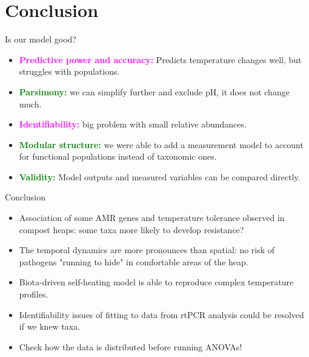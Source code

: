 \documentclass[mathserif,11pt]{beamer}
\begin{document}
\section{Conclusion}
\begin{frame}{Is our model good?}
\vspace{0.5cm}
	\begin{itemize}
		\item<1-> \textbf{\textcolor{magenta}{Predictive power and accuracy:}} Predicts temperature changes well, but struggles with populations.
		\item<2-> \textbf{\textcolor{green}{Parsimony:}} we can simplify further and exclude pH, it does not change much.
		\item<3-> \textbf{\textcolor{magenta}{Identifiability:}} big problem with small relative abundances.
		\item<4->  \textbf{\textcolor{green}{Modular structure:}} we were able to add a measurement model to account for functional populations instead of taxonomic ones.
		\item<5-> \textbf{\textcolor{green}{Validity:}} Model outputs and measured variables can be compared directly.
	\end{itemize}
\end{frame}
\begin{frame}{Conclusion}
\begin{itemize}
	\item Association of some AMR genes and temperature tolerance observed in compost heaps: some taxa more likely to develop resistance?
	\item The temporal dynamics are more pronounces than spatial: no risk of pathogens "running to hide" in comfortable areas of the heap.
	\item Biota-driven self-heating model is able to reproduce complex temperature profiles.
	\item Identifiability issues of fitting to data from rtPCR analysis could be resolved if we knew taxa.
    \item Check how the data is distributed before running ANOVAs!
\end{itemize}	
\end{frame}
\appendix
\end{document}
